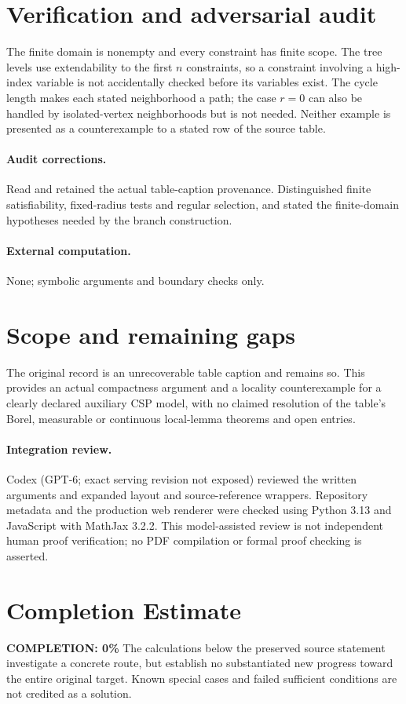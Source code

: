 \documentclass[11pt]{article}
\begin{document}
\section{Verification and adversarial audit}

The finite domain is nonempty and every constraint has finite scope. The tree
levels use extendability to the first $n$ constraints, so a constraint involving
a high-index variable is not accidentally checked before its variables exist.
The cycle length makes each stated neighborhood a path; the case $r=0$ can
also be handled by isolated-vertex neighborhoods but is not needed. Neither
example is presented as a counterexample to a stated row of the source table.

\paragraph{Audit corrections.} Read and retained the actual table-caption provenance. Distinguished
finite satisfiability, fixed-radius tests and regular selection, and stated the
finite-domain hypotheses needed by the branch construction.
\paragraph{External computation.} None; symbolic arguments and boundary checks only.
\section{Scope and remaining gaps}

The original record is an unrecoverable table caption and remains so. This
provides an actual compactness argument and a locality counterexample for a
clearly declared auxiliary CSP model, with no claimed resolution of the table's
Borel, measurable or continuous local-lemma theorems and open entries.

\paragraph{Integration review.} Codex (GPT-6; exact serving revision not exposed) reviewed the written arguments and expanded layout and source-reference wrappers. Repository metadata and the production web renderer were checked using Python 3.13 and JavaScript with MathJax 3.2.2. This model-assisted review is not independent human proof verification; no PDF compilation or formal proof checking is asserted.

\section{Completion Estimate}
\noindent\textbf{COMPLETION: 0\%}
The calculations below the preserved source statement investigate a concrete route,
but establish no substantiated new progress toward the entire original target.
Known special cases and failed sufficient conditions are not credited as a solution.
\end{document}

